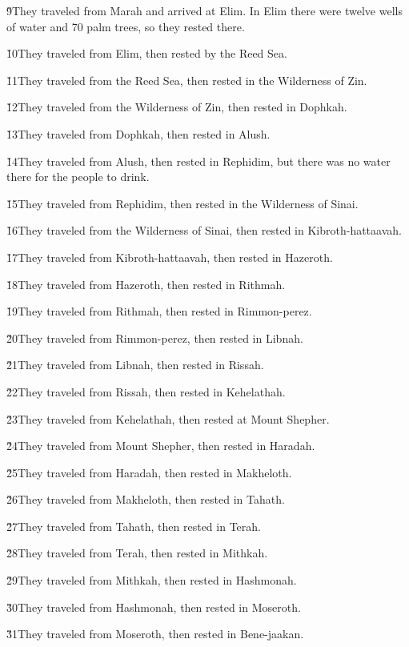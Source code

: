 \v{9}They traveled from Marah and arrived at Elim. In Elim there were twelve wells of water and 70 palm trees, so they rested there.

\v{10}They traveled from Elim, then rested by the Reed Sea.

\v{11}They traveled from the Reed Sea, then rested in the Wilderness of Zin.

\v{12}They traveled from the Wilderness of Zin, then rested in Dophkah.

\v{13}They traveled from Dophkah, then rested in Alush.

\v{14}They traveled from Alush, then rested in Rephidim, but there was no water there for the people to drink.

\v{15}They traveled from Rephidim, then rested in the Wilderness of Sinai.

\v{16}They traveled from the Wilderness of Sinai, then rested in Kibroth-hattaavah.

\v{17}They traveled from Kibroth-hattaavah, then rested in Hazeroth.

\v{18}They traveled from Hazeroth, then rested in Rithmah.

\v{19}They traveled from Rithmah, then rested in Rimmon-perez.

\v{20}They traveled from Rimmon-perez, then rested in Libnah.

\v{21}They traveled from Libnah, then rested in Rissah.

\v{22}They traveled from Rissah, then rested in Kehelathah.

\v{23}They traveled from Kehelathah, then rested at Mount Shepher.

\v{24}They traveled from Mount Shepher, then rested in Haradah.

\v{25}They traveled from Haradah, then rested in Makheloth.

\v{26}They traveled from Makheloth, then rested in Tahath.

\v{27}They traveled from Tahath, then rested in Terah.

\v{28}They traveled from Terah, then rested in Mithkah.

\v{29}They traveled from Mithkah, then rested in Hashmonah.

\v{30}They traveled from Hashmonah, then rested in Moseroth.

\v{31}They traveled from Moseroth, then rested in Bene-jaakan.

